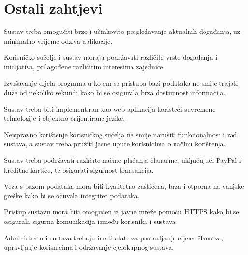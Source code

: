 		\section{Ostali zahtjevi}

			 \begin{packed_item}
			\item Sustav treba omogućiti brzo i učinkovito pregledavanje aktualnih događanja, uz minimalno vrijeme odziva aplikacije.
			\item Korisničko sučelje i sustav moraju podržavati različite vrste događanja i inicijativa, prilagođene različitim interesima zajednice.
			\item Izvršavanje dijela programa u kojem se pristupa bazi podataka ne smije trajati duže od nekoliko sekundi kako bi se osigurala brza dostupnost informacija.
			\item Sustav treba biti implementiran kao web-aplikacija koristeći suvremene tehnologije i objektno-orijentirane jezike.
			\item Neispravno korištenje korisničkog sučelja ne smije narušiti funkcionalnost i rad sustava, a sustav treba pružiti jasne upute korisnicima o načinu korištenja.
			\item Sustav treba podržavati različite načine plaćanja članarine, uključujući PayPal i kreditne kartice, te osigurati sigurnost transakcija.
			\item Veza s bazom podataka mora biti kvalitetno zaštićena, brza i otporna na vanjske greške kako bi se očuvala integritet podataka.
			\item Pristup sustavu mora biti omogućen iz javne mreže pomoću HTTPS kako bi se osigurala sigurna komunikacija između korisnika i sustava.
			\item Administratori sustava trebaju imati alate za postavljanje cijena članstva, upravljanje korisnicima i održavanje cjelokupnog sustava.
			 \end{packed_item}
			 
			 
	